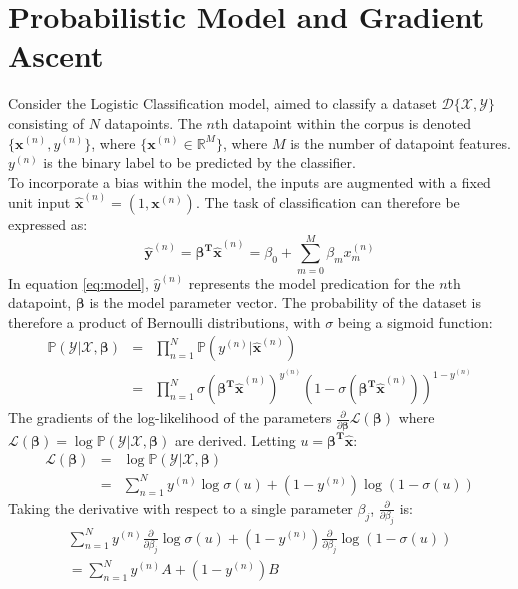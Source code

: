 \documentclass[journal]{IEEEtran}
\begin{document}
\section{Probabilistic Model and Gradient Ascent}
Consider the Logistic Classification model, aimed to classify a dataset $\mathcal{D}\{\mathcal{X}, \mathcal{Y}\}$ consisting of $N$ datapoints. The $n$th datapoint within the corpus is denoted $\{\bm{x}^{(n)}, y^{(n)}\}$, where $\{\bm{x}^{(n)}\in \mathbb{R}^M\}$, where $M$ is the number of datapoint features. $y^{(n)}$ is the binary label to be predicted by the classifier.\\
To incorporate a bias within the model, the inputs are augmented with a fixed unit input $\bm{\hat{x}}^{(n)}=(1, \bm{x}^{(n)})$. The task of classification can therefore be expressed as:
\begin{equation}
    \bm{\hat{y}}^{(n)} =  \bm{\beta^T\hat{x}}^{(n)} = \beta_0 + \sum_{m=0}^M \beta_m x_m^{(n)}
    \label{eq:model}
\end{equation}
In equation \ref{eq:model}, $\hat{y}^{(n)}$ represents the model predication for the $n$th datapoint, $\bm{\beta}$ is the model parameter vector. The probability of the dataset is therefore a product of Bernoulli distributions, with $\sigma$ being a sigmoid function:
\begin{eqnarray}
    \mathbb{P}(\mathcal{Y}|\mathcal{X}, \bm{\beta}) &=& \prod_{n=1}^{N}\mathbb{P}(  y^{(n)}  |  \bm{\hat{x}}^{(n)}  )\\
    &=&  \prod_{n=1}^{N} \sigma(\bm{\beta^T\hat{x}}^{(n)})^{y^{(n)}}(1-\sigma(\bm{\beta^T\hat{x}}^{(n)}))^{1-y^{(n)}}
    \label{eq:liklihood}
\end{eqnarray}
The gradients of the log-likelihood of the parameters $\frac{\partial }{\partial \bm{\beta}} \mathcal{L}(\bm{\beta})$ where $\mathcal{L}(\bm{\beta}) = \log \mathbb{P}(\mathcal{Y}|\mathcal{X}, \bm{\beta})$ are derived. Letting $u = \bm{\beta^T\hat{x}}$:
\begin{eqnarray}
    \mathcal{L}(\bm{\beta}) &=& \log \mathbb{P}(\mathcal{Y}|\mathcal{X}, \bm{\beta}) \\
    &=& \sum_{n=1}^N y^{(n)}\log \sigma (u) + (1-y^{(n)})\log (1- \sigma (u))
\end{eqnarray}
Taking the derivative with respect to a single parameter $\beta_j$, $\frac{\partial }{\partial \beta_j}$ is:
\begin{eqnarray}
   \sum_{n=1}^N y^{(n)} \frac{\partial }{\partial \beta_j} \log \sigma (u) + (1-y^{(n)}) \frac{\partial }{\partial \beta_j} \log (1- \sigma (u))\\
   = \sum_{n=1}^N y^{(n)} A + (1-y^{(n)}) B \label{eq:comp}
\end{eqnarray}
\end{document}

